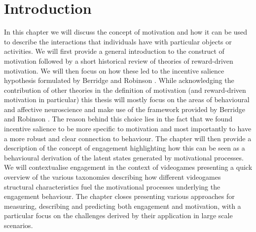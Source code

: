 \section{Introduction}
\label{motivation_engagement_introduction}
In this chapter we will discuss the concept of motivation and how it can be used to describe the interactions that individuals have with particular objects or activities. We will first provide a general introduction to the construct of motivation followed by a short historical review of theories of reward-driven motivation. We will then focus on how these led to the incentive salience hypothesis formulated by Berridge and Robinson \cite{berridge1998role}. While acknowledging the contribution of other theories in the definition of motivation (and reward-driven motivation in particular) this thesis will mostly focus on the areas of behavioural and affective neuroscience and make use of the framework provided by Berridge and Robinson \cite{berridge1998role}. The reason behind this choice lies in the fact that we found incentive salience to be more specific to motivation and most importantly to have a more robust and clear connection to behaviour. The chapter will then provide a description of the concept of engagement highlighting how this can be seen as a behavioural derivation of the latent states generated by motivational processes. We will contextualise engagement in the context of videogames presenting a quick overview of the various taxonomies describing how different videogames structural characteristics fuel the motivational processes underlying the engagement behaviour. The chapter closes presenting various approaches for measuring, describing and predicting both engagement and motivation, with a particular focus on the challenges derived by their application in large scale scenarios.

